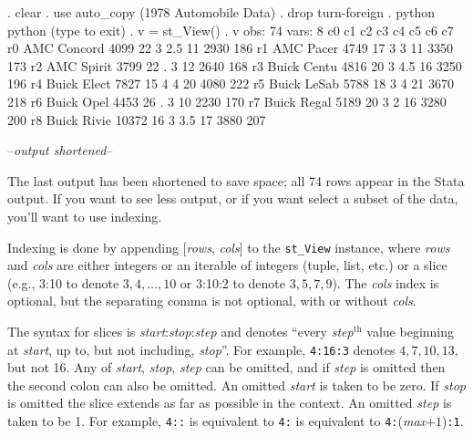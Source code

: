 \documentclass{article}
\begin{document}
\begin{stlog}
{\smallskip}
. clear
{\smallskip}
. use auto_copy
(1978 Automobile Data)
{\smallskip}
. drop turn-foreign
{\smallskip}
. python
 python (type {} to exit) 
. v = st_View()
{\smallskip}
. v
{\smallskip}
  obs: 74
 vars:  8
{\smallskip}
             c0       c1       c2       c3       c4       c5       c6       c7
 r0 AMC Concord     4099       22        3      2.5       11     2930      186
 r1   AMC Pacer     4749       17        3        3       11     3350      173
 r2  AMC Spirit     3799       22        .        3       12     2640      168
 r3 Buick Centu     4816       20        3      4.5       16     3250      196
 r4 Buick Elect     7827       15        4        4       20     4080      222
 r5 Buick LeSab     5788       18        3        4       21     3670      218
 r6  Buick Opel     4453       26        .        3       10     2230      170
 r7 Buick Regal     5189       20        3        2       16     3280      200
 r8 Buick Rivie    10372       16        3      3.5       17     3880      207

--\textit{output shortened}--
\end{stlog}

\vspace{3mm}
The last output has been shortened to save space; all 74 rows appear in the Stata output. If you want to see less output, or if you want select a subset of the data, you'll want to use indexing.

Indexing is done by appending [\textit{rows}, \textit{cols}] to the \lstinline{st_View} instance, where \textit{rows} and \textit{cols} are either integers or an iterable of integers (tuple, list, etc.) or a slice (e.g., 3:10 to denote $3, 4, \ldots, 10$ or 3:10:2 to denote $3, 5, 7, 9$). The \textit{cols} index is optional, but the separating comma is not optional, with or without \textit{cols}. 

The syntax for slices is \textit{start}:\textit{stop}:\textit{step} and denotes ``every \textit{step}$^{\text{th}}$ value beginning at \textit{start}, up to, but not including, \textit{stop}''. For example, \lstinline{4:16:3} denotes $4, 7, 10, 13$, but not 16. Any of \textit{start}, \textit{stop}, \textit{step} can be omitted, and if \textit{step} is omitted then the second colon can also be omitted. An omitted \textit{start} is taken to be zero. If \textit{stop} is omitted the slice extends as far as possible in the context. An omitted \textit{step} is taken to be 1. For example,
\lstinline{4::} is equivalent to \lstinline{4:} is equivalent to \lstinline{4:}(\textit{max}$ + 1$)\lstinline{:1}.
\end{document}
